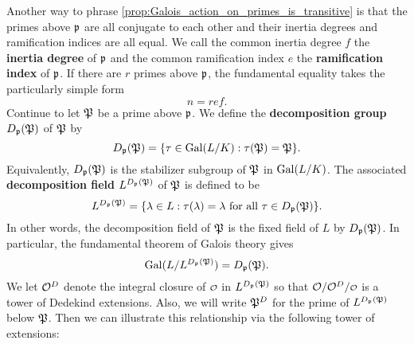     Another way to phrase \cref{prop:Galois_action_on_primes_is_transitive} is that the primes above $\mathfrak{p}$ are all conjugate to each other and their inertia degrees and ramification indices are all equal. We call the common inertia degree $f$ the \textbf{inertia degree} of $\mathfrak{p}$ and the common ramification index $e$ the \textbf{ramification index} of $\mathfrak{p}$. If there are $r$ primes above $\mathfrak{p}$, the fundamental equality takes the particularly simple form
    \[
      n = ref.
    \]
    Continue to let $\mathfrak{P}$ be a prime above $\mathfrak{p}$. We define the \textbf{decomposition group} $D_{\mathfrak{p}}(\mathfrak{P})$ of $\mathfrak{P}$ by
    \[
      D_{\mathfrak{p}}(\mathfrak{P}) = \{\tau \in \operatorname{\mathrm{Gal}}(L/K):\tau(\mathfrak{P}) = \mathfrak{P}\}.
    \]
    Equivalently, $D_{\mathfrak{p}}(\mathfrak{P})$ is the stabilizer subgroup of $\mathfrak{P}$ in $\operatorname{\mathrm{Gal}}(L/K)$. The associated \textbf{decomposition field} $L^{D_{\mathfrak{p}}(\mathfrak{P})}$ of $\mathfrak{P}$ is defined to be
    \[
      L^{D_{\mathfrak{p}}(\mathfrak{P})} = \{\lambda \in L:\text{$\tau(\lambda) = \lambda$ for all $\tau \in D_{\mathfrak{p}}(\mathfrak{P})$}\}.
    \]
    In other words, the decomposition field of $\mathfrak{P}$ is the fixed field of $L$ by $D_{\mathfrak{p}}(\mathfrak{P})$. In particular, the fundamental theorem of Galois theory gives
    \[
      \operatorname{\mathrm{Gal}}(L/L^{D_{\mathfrak{p}}(\mathfrak{P})}) = D_{\mathfrak{p}}(\mathfrak{P}).
    \]
    We let $\mathcal{O}^{D}$ denote the integral closure of $\smc{O}$ in $L^{D_{\mathfrak{p}}(\mathfrak{P})}$ so that $\mc{O}/\mc{O}^{D}/\smc{O}$ is a tower of Dedekind extensions. Also, we will write $\mathfrak{P}^{D}$ for the prime of $L^{D_{\mathfrak{p}}(\mathfrak{P})}$ below $\mathfrak{P}$. Then we can illustrate this relationship via the following tower of extensions:
    
    \begin{center}
    \end{center}

